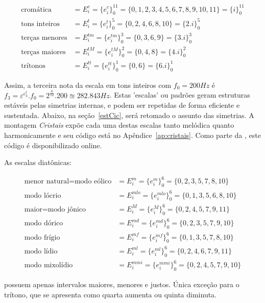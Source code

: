 \begin{equation}\label{escSim}
\begin{split}
\text{cromática} & = E_i^c = \{e_i^c\}_0^{11} =  \{0,1,2,3,4,5,6,7,8,9,10,11\} = \{i\}_0^{11}\\
\text{tons inteiros} & = E_i^t = \{e_i^t\}_0^{5} = \{0,2,4,6,8,10\} = \{2.i\}_0^{5} \\
\text{terças menores} & = E_i^{tm} = \{e_i^{tm}\}_0^{3} = \{0,3,6,9\} = \{3.i\}_0^3 \\
\text{terças maiores} & = E_i^{tM} = \{e_i^{tM}\}_0^{2} = \{0,4,8\} = \{4.i\}_0^2\\
\text{trítonos} & = E_i^{tt} = \{e_i^{tt}\}_0^{1} = \{ 0, 6 \} = \{6.i\}_0^1
\end{split}
\end{equation}

Assim, a terceira nota da escala em tons inteiros com $f_0=200Hz$
é $f_3=\varepsilon^{e_3^t} . f_0 = 2^{\frac{6}{12}} . 200 \approxeq 282.843 Hz$. Estas
'escalas' ou padrões geram estruturas estáveis pelas simetrias internas, e podem ser
repetidas de forma eficiente e sustentada. Abaixo, na seção~\ref{estCic}, será retomado o assunto das simetrias. A montagem \emph{Cristais} expõe cada uma destas escalas tanto melódica quanto harmonicamente e seu código está no Apêndice~\ref{ap:cristais}. Como parte da \massa, este código é disponibilizado online.

As escalas diatônicas:

\begin{equation}\label{eq:escalas}
\begin{split}
\text{menor natural} = \text{modo eólico} & = E_i^m = \{e_i^m\}_0^6 = \{0,2,3,5,7,8,10\} \\
\text{modo lócrio} & = E_i^{mlo} = \{e_i^{mlo}\}_0^6 = \{0,1,3,5,6,8,10\} \\ 
\text{maior}  = \text{modo jônico} & = E_i^M = \{e_i^M\}_0^6 = \{0,2,4,5,7,9,11\} \\
\text{modo dórico} & = E_i^{md} = \{e_i^{md}\}_0^6 = \{0,2,3,5,7,9,10\} \\
\text{modo frígio} & = E_i^{mf} = \{e_i^{mf}\}_0^6 = \{0,1,3,5,7,8,10\} \\
\text{modo lídio} & = E_i^{ml}=\{e_i^{ml}\}_0^6 = \{0,2,4,6,7,9,11\} \\
\text{modo mixolídio} & = E_i^{mmi} = \{e_i^{mmi}\}_0^6 = \{0,2,4,5,7,9,10\}
\end{split}
\end{equation}

possuem apenas intervalos maiores, menores e justos. Única exceção para o trítono, que se apresenta como quarta aumenta ou quinta diminuta.

